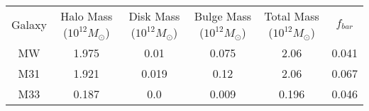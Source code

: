 \begin{table}
\begin{tabular}{cccccc}
Galaxy & Halo Mass ($10^{12} M_{\odot}$) & Disk Mass ($10^{12} M_{\odot}$) & Bulge Mass ($10^{12} M_{\odot}$) & Total Mass ($10^{12} M_{\odot}$) & $f_{bar}$ \\
MW & 1.975 & 0.01 & 0.075 & 2.06 & 0.041 \\
M31 & 1.921 & 0.019 & 0.12 & 2.06 & 0.067 \\
M33 & 0.187 & 0.0 & 0.009 & 0.196 & 0.046 \\
\end{tabular}
\end{table}
